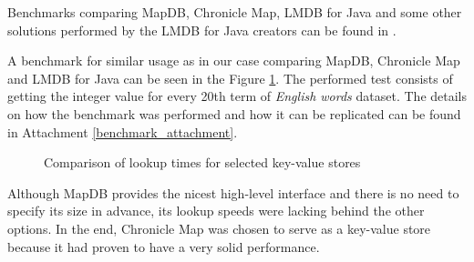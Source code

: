 Benchmarks comparing MapDB, Chronicle Map, LMDB for Java and some other solutions performed by the LMDB for Java creators
can be found in \citep{lmdb}.

A benchmark for similar usage as in our case comparing MapDB, Chronicle Map and LMDB for Java can be seen in the Figure \ref{comp_maps}.
The performed test consists of getting the integer value for every 20th term of \textit{English words} dataset.
The details on how the benchmark was performed and how it can be replicated can be found in Attachment \ref{benchmark_attachment}.

\begin{figure}[htbp]
    \centering
    \caption{Comparison of lookup times for selected key-value stores}
    \label{comp_maps}
\end{figure}

Although MapDB provides the nicest high-level interface and there is no need to specify its size in advance,
its lookup speeds were lacking behind the other options.
In the end, Chronicle Map was chosen to serve as a key-value store because it had proven to have a very solid performance.

